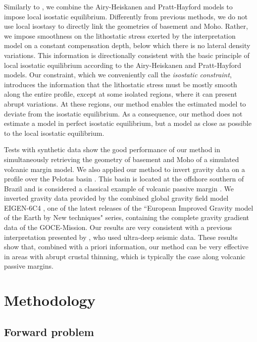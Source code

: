\documentclass[manuscript]{geophysics}
\begin{document}
Similarly to \citet{ferderer-etal2017}, we combine the Airy-Heiskanen and Pratt-Hayford
models to impose local isostatic equilibrium.
Differently from previous methods, we do not use local isostasy to directly link
the geometries of basement and Moho.
Rather, we impose smoothness on the lithostatic stress exerted by the interpretation 
model on a constant compensation depth, below which there is no lateral density variations.
This information is directionally consistent with the basic principle of 
local isostatic equilibrium according to the Airy-Heiskanen and Pratt-Hayford models.
Our constraint, which we conveniently call the \textit{isostatic constraint},
introduces the information that the lithostatic stress must be mostly smooth along the 
entire profile, except at some isolated regions, where it can present abrupt variations.
At these regions, our method enables the estimated model to deviate from the 
isostatic equilibrium.
As a consequence, our method does not estimate a model in perfect isostatic equilibrium, 
but a model as close as possible to the local isostatic equilibrium. 

Tests with synthetic data show the good performance of our method in simultaneously
retrieving the geometry of basement and Moho of a simulated volcanic margin
model. We also applied our method to invert 
gravity data on a profile over the Pelotas basin \citep{stica-etal2014}. This basin is
located at the offshore southern of Brazil and is considered a classical example 
of volcanic passive margin \citep{geoffroy2005}. 
We inverted gravity data provided by the combined global gravity field model EIGEN-6C4
\citep{forste2014}, one of the latest releases of the ``European Improved Gravity model of 
the Earth by New techniques" series, containing the complete gravity gradient data of the 
GOCE-Mission.
Our results are very consistent with a previous
interpretation presented by \citet{zalan2015}, who used ultra-deep seismic data.
These results show that, combined with a priori information, our method can be very effective in 
areas with abrupt crustal thinning, which is typically the case along volcanic passive margins.

\section{Methodology}


\subsection{Forward problem}
\end{document}
